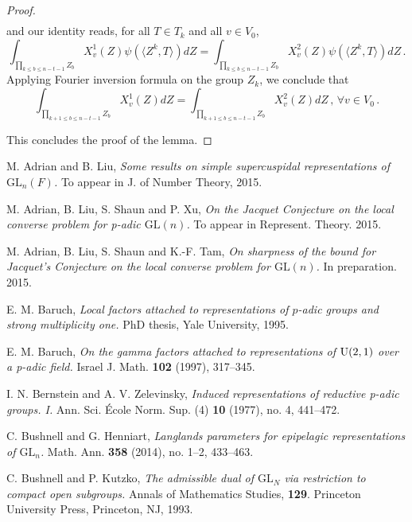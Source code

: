 \documentclass[12pt]{amsart}
\begin{document}
\begin{proof}
\begin{align*}
\end{align*}
and our identity reads, for all $T\in T_k$ and all $v \in V_0$, 
\[ \int_{\prod_{k\leq b \leq n-t-1} Z_b} X_v^1(Z)  \psi( \langle Z^k, T\rangle) d Z = \int_{\prod_{k\leq b \leq n-t-1} Z_b} X_v^2(Z)  \psi( \langle Z^k, T\rangle) d Z\,. \]
Applying Fourier inversion formula on the group $Z_k$, we conclude that 
\[ \int_{\prod_{k+1 \leq b \leq n-t-1} Z_b} X_v^1(Z) d Z = \int_{\prod_{k+1 \leq b \leq n-t-1} Z_b} X_v^2(Z) d Z\,,\, \forall v \in V_0\,. \]

This concludes the proof of the lemma. 
\end{proof}

\begin{thebibliography}{}
M. Adrian and B. Liu,
{\it Some results on simple supercuspidal representations of ${{\mathrm{GL}}}_n(F)$.}
To appear in J. of Number Theory, 2015.

M. Adrian, B. Liu, S. Shaun and P. Xu,
{\it On the Jacquet Conjecture on the local converse problem for p-adic ${{\mathrm{GL}}}(n)$.}
To appear in Represent. Theory. 2015. 

M. Adrian, B. Liu, S. Shaun and K.-F. Tam,
{\it On sharpness of the bound for Jacquet's Conjecture on the local converse problem for ${{\mathrm{GL}}}(n)$.}
In preparation. 2015. 

E. M. Baruch, 
{\it Local factors attached to representations of $p$-adic groups and strong multiplicity one.} 
PhD thesis, Yale University, 1995. 

E. M. Baruch, 
{\it On the gamma factors attached to representations of $\rm{U}(2,1)$ over a p-adic field.} 
Israel J. Math. \textbf{102} (1997), 317--345.

I. N. Bernstein and A. V. Zelevinsky,
{\it Induced representations of reductive p-adic groups. I.}
Ann. Sci. \'Ecole Norm. Sup. (4) \textbf{10} (1977), no. 4, 441--472. 

C. Bushnell and G. Henniart,
{\it Langlands parameters for epipelagic representations of ${{\mathrm{GL}}}_n$.}
Math. Ann. \textbf{358} (2014), no. 1--2, 433--463.

C. Bushnell and P. Kutzko,
{\it The admissible dual of ${{\mathrm{GL}}}_N$ via restriction to compact open subgroups.} Annals of Mathematics Studies, \textbf{129}. Princeton University Press, Princeton, NJ, 1993.


\end{thebibliography}
\end{document}
